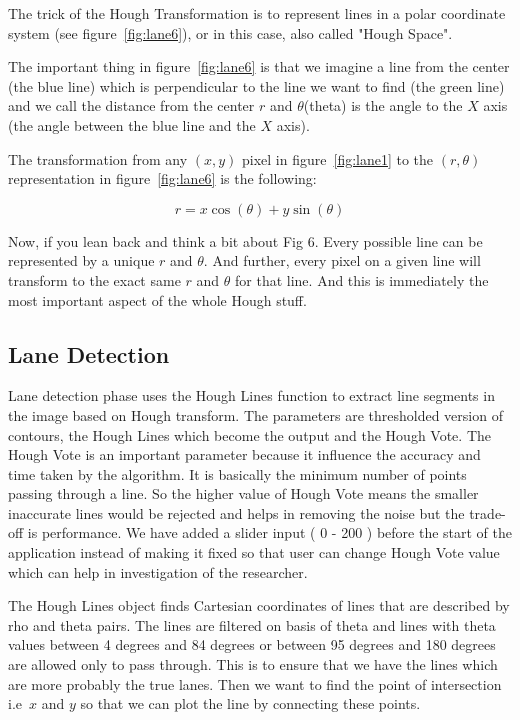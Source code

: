 The trick of the Hough Transformation is to represent lines in a polar coordinate system (see figure~\ref{fig:lane6}), or in this case, also called "Hough Space". 

The important thing in figure~\ref{fig:lane6} is that we imagine a line from the center (the blue line) which is perpendicular to the line we want to find (the green line) and we call the distance from the center $r$ and $\theta$(theta) is the angle to the $X$ axis (the angle between the blue line and the $X$ axis).

The transformation from any $(x, y)$ pixel in figure~\ref{fig:lane1} to the $(r, \theta)$ representation in figure~\ref{fig:lane6} is the following:

\begin{equation}
    r = x \cos(\theta) + y \sin(\theta) 
\end{equation}

Now, if you lean back and think a bit about Fig 6. Every possible line can be represented by a unique $r$ and $\theta$. And further, every pixel on a given line will transform to the exact same $r$ and $\theta$ for that line. And this is immediately the most important aspect of the whole Hough stuff. 

\subsection{Lane Detection}

Lane detection phase uses the Hough Lines function to extract line segments in the image based on Hough transform. The parameters are thresholded version of contours, the Hough Lines which become the output and the Hough Vote. The Hough Vote is an important parameter because it influence the accuracy and time taken by the algorithm. It is basically the minimum number of points passing through a line. So the higher value of Hough Vote means the smaller inaccurate lines would be rejected and helps in removing the noise but the trade-off is performance. We have added a slider input ( 0 - 200 ) before the start of the application instead of making it fixed so that user can change Hough Vote value which can help in investigation of the researcher.

The Hough Lines object finds Cartesian coordinates of lines that are described by rho and theta pairs. The lines are filtered on basis of theta and lines with theta values between 4 degrees and 84 degrees or between 95 degrees and 180 degrees are allowed only to pass through. This is to ensure that we have the lines which are more probably the true lanes. Then we want to find the point of intersection i.e\ $x$ and $y$ so that we can plot the line by connecting these points.

